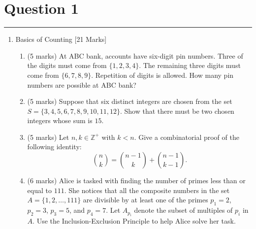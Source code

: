 \documentclass{article}
\begin{document}
\newcommand{\documentcourse}{COMP2121}
\newcommand{\documentnumber}{3}





\section*{Question 1}
\hrule
\vspace{0.5cm}

\begin{enumerate}
    \item Basics of Counting [21 Marks]
          \begin{enumerate}
              \item (5 marks) At ABC bank, accounts have six-digit pin numbers. Three of the digits must come from
                    $\{1, 2, 3, 4\}$. The remaining three digits must come from $\{6, 7, 8, 9\}$. Repetition of digits is allowed.
                    How many pin numbers are possible at ABC bank?

              \item (5 marks) Suppose that six distinct integers are chosen from the set $S = \{3, 4, 5, 6, 7, 8, 9, 10, 11, 12\}$.
                    Show that there must be two chosen integers whose sum is $15$.

              \item (5 marks) Let $n, k \in \mathbb{Z}^+$ with $k < n$. Give a combinatorial proof of the following identity:
                    \[
                        \binom{n}{k} = \binom{n-1}{k} + \binom{n-1}{k-1}.
                    \]

              \item (6 marks) Alice is tasked with finding the number of primes less than or equal to $111$. She notices that all
                    the composite numbers in the set $A = \{1, 2, \dots, 111\}$ are divisible by at least one of the primes
                    $p_1 = 2$, $p_2 = 3$, $p_3 = 5$, and $p_4 = 7$. Let $A_{p_i}$ denote the subset of multiples of $p_i$ in $A$.
                    Use the Inclusion-Exclusion Principle to help Alice solve her task.
          \end{enumerate}
\end{enumerate}
\end{document}
